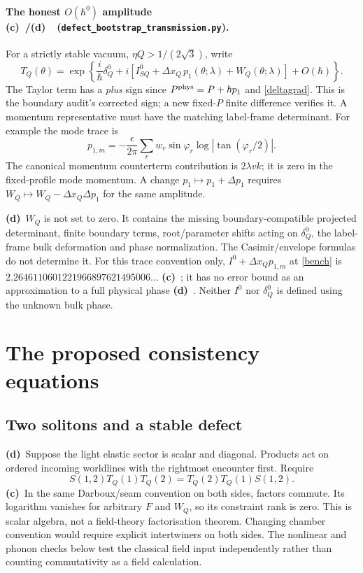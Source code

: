 \documentclass[11pt,a4paper]{article}
\newcommand{\C}{\textbf{(c)}\ }
\newcommand{\D}{\textbf{(d)}\ }
\newcommand{\file}[1]{\nolinkurl{#1}}
\newcommand{\tra}{\file{defect_bootstrap_transmission.py}}
\begin{document}
\paragraph{The honest $O(\hbar^0)$ amplitude \C/\D\ (\tra).}
For a strictly stable vacuum, $\eta Q>1/(2\sqrt3)$, write
\begin{equation}
 \boxed{T_Q(\theta)=\exp\left\{\frac{i}{\hbar}\delta_Q^0
       +i\left[I_{SQ}^0+\Delta x_Q\,p_1(\theta;\lambda)
                    +W_Q(\theta;\lambda)\right]+O(\hbar)\right\}.}
 \label{T}
\end{equation}
The Taylor term has a \emph{plus} sign since $P^{\rm phys}=P+\hbar p_1$
and \eqref{deltagrad}. This is the boundary audit's corrected sign;
a new fixed-$P$ finite difference verifies it. A momentum representative
must have the matching label-frame determinant. For example the mode trace is
\begin{equation}
 p_{1,m}=-\frac{\epsilon}{2\pi}\sum_rw_r\sin\varphi_r
                                  \log|\tan(\varphi_r/2)|.\label{pm}
\end{equation}
The canonical momentum counterterm contribution is $2\lambda vk$; it is zero
in the fixed-profile mode momentum. A change $p_1\mapsto p_1+\Delta p_1$
requires $W_Q\mapsto W_Q-\Delta x_Q\Delta p_1$ for the same amplitude.

\D $W_Q$ is not set to zero. It contains the missing boundary-compatible
projected determinant, finite boundary terms, root/parameter shifts acting on
$\delta_Q^0$, the label-frame bulk deformation and phase normalization.
The Casimir/envelope formulas do not determine it. For this trace convention
only, $I^0+\Delta x_Qp_{1,m}$ at \eqref{bench} is
$2.2646110601221966897621495006\ldots$ \C; it has no error bound as an
approximation to a full physical phase \D. Neither $I^0$ nor $\delta_Q^0$
is defined using the unknown bulk phase.

\section{The proposed consistency equations}
\subsection{Two solitons and a stable defect}
\D Suppose the light elastic sector is scalar and diagonal. Products act on
ordered incoming worldlines with the rightmost encounter first. Require
\begin{equation}
 S(1,2)T_Q(1)T_Q(2)=T_Q(2)T_Q(1)S(1,2).\label{RTT}
\end{equation}
\C In the same Darboux/seam convention on both sides, factors commute.
Its logarithm vanishes for arbitrary $F$ and $W_Q$, so its constraint rank
is zero. This is scalar algebra, not a field-theory factorisation theorem.
Changing chamber convention would require explicit intertwiners on both
sides. The nonlinear and phonon checks below test the classical field input
independently rather than counting commutativity as a field calculation.
\end{document}
